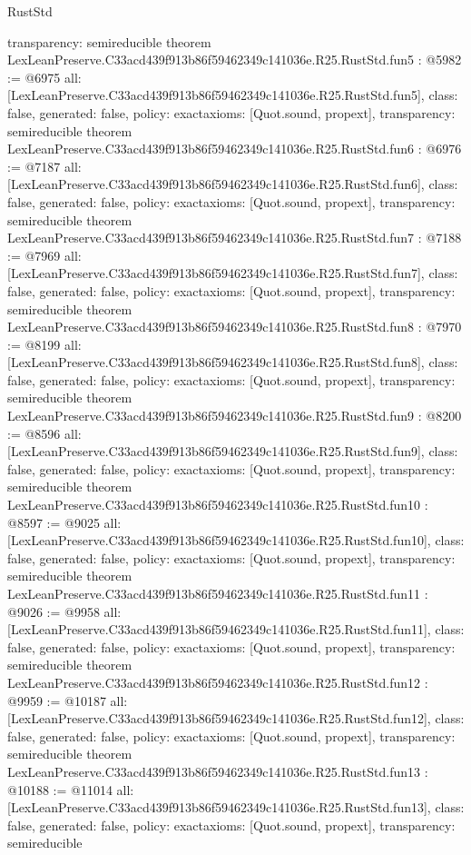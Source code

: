 \begin{lexlean}{RustStd}
\begin{coremodule}
{  transparency: semireducible
}
theorem LexLeanPreserve.C33acd439f913b86f59462349c141036e.R25.RustStd.fun5 : @5982 := @6975 {
  all: [LexLeanPreserve.C33acd439f913b86f59462349c141036e.R25.RustStd.fun5],
  class: false,
  generated: false,
  policy: exact{axioms: [Quot.sound, propext]},
  transparency: semireducible
}
theorem LexLeanPreserve.C33acd439f913b86f59462349c141036e.R25.RustStd.fun6 : @6976 := @7187 {
  all: [LexLeanPreserve.C33acd439f913b86f59462349c141036e.R25.RustStd.fun6],
  class: false,
  generated: false,
  policy: exact{axioms: [Quot.sound, propext]},
  transparency: semireducible
}
theorem LexLeanPreserve.C33acd439f913b86f59462349c141036e.R25.RustStd.fun7 : @7188 := @7969 {
  all: [LexLeanPreserve.C33acd439f913b86f59462349c141036e.R25.RustStd.fun7],
  class: false,
  generated: false,
  policy: exact{axioms: [Quot.sound, propext]},
  transparency: semireducible
}
theorem LexLeanPreserve.C33acd439f913b86f59462349c141036e.R25.RustStd.fun8 : @7970 := @8199 {
  all: [LexLeanPreserve.C33acd439f913b86f59462349c141036e.R25.RustStd.fun8],
  class: false,
  generated: false,
  policy: exact{axioms: [Quot.sound, propext]},
  transparency: semireducible
}
theorem LexLeanPreserve.C33acd439f913b86f59462349c141036e.R25.RustStd.fun9 : @8200 := @8596 {
  all: [LexLeanPreserve.C33acd439f913b86f59462349c141036e.R25.RustStd.fun9],
  class: false,
  generated: false,
  policy: exact{axioms: [Quot.sound, propext]},
  transparency: semireducible
}
theorem LexLeanPreserve.C33acd439f913b86f59462349c141036e.R25.RustStd.fun10 : @8597 := @9025 {
  all: [LexLeanPreserve.C33acd439f913b86f59462349c141036e.R25.RustStd.fun10],
  class: false,
  generated: false,
  policy: exact{axioms: [Quot.sound, propext]},
  transparency: semireducible
}
theorem LexLeanPreserve.C33acd439f913b86f59462349c141036e.R25.RustStd.fun11 : @9026 := @9958 {
  all: [LexLeanPreserve.C33acd439f913b86f59462349c141036e.R25.RustStd.fun11],
  class: false,
  generated: false,
  policy: exact{axioms: [Quot.sound, propext]},
  transparency: semireducible
}
theorem LexLeanPreserve.C33acd439f913b86f59462349c141036e.R25.RustStd.fun12 : @9959 := @10187 {
  all: [LexLeanPreserve.C33acd439f913b86f59462349c141036e.R25.RustStd.fun12],
  class: false,
  generated: false,
  policy: exact{axioms: [Quot.sound, propext]},
  transparency: semireducible
}
theorem LexLeanPreserve.C33acd439f913b86f59462349c141036e.R25.RustStd.fun13 : @10188 := @11014 {
  all: [LexLeanPreserve.C33acd439f913b86f59462349c141036e.R25.RustStd.fun13],
  class: false,
  generated: false,
  policy: exact{axioms: [Quot.sound, propext]},
  transparency: semireducible
}
\end{coremodule}
\end{lexlean}
